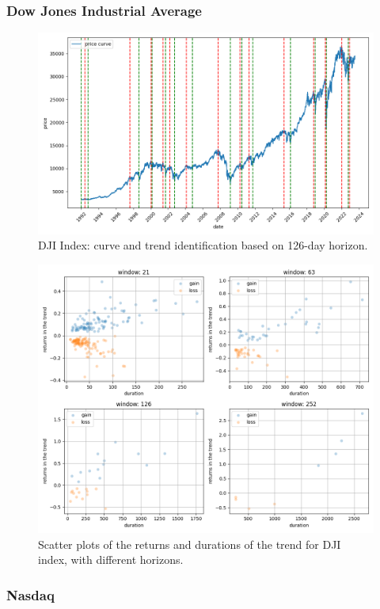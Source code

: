 \subsubsection{Dow Jones Industrial Average}


\begin{figure}[h]
	\centering
	\includegraphics[width=0.8\linewidth]{chapters/chapter1/figures/curve_DJI_126D}
	\caption{DJI Index: curve and trend identification based on 126-day horizon.}
	\label{fig:curvedji126d}
\end{figure}

\begin{figure}[h]
	\centering
	\includegraphics[width=1\linewidth]{chapters/chapter1/figures/scatter_DJI}
	\caption{Scatter plots of the returns and durations of the trend for DJI index, with different horizons.}
	\label{fig:scatterdji}
\end{figure}

\subsubsection{Nasdaq}


